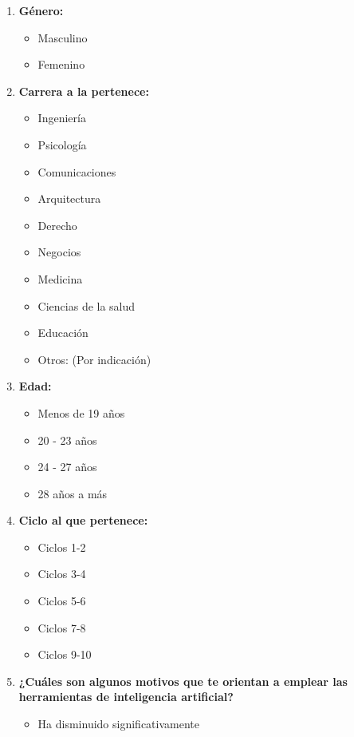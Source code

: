 \documentclass{article}
\newenvironment{recoleccionDeInformacion}{}{}
\begin{document}
\begin{recoleccionDeInformacion}
  \begin{multicols}{2}
    \begin{enumerate}
      \item \textbf{Género:}
      \begin{itemize}
        \item Masculino
        \item Femenino
      \end{itemize}
      \item \textbf{Carrera a la pertenece:}
      \begin{itemize}
        \item Ingeniería
        \item Psicología
        \item Comunicaciones
        \item Arquitectura
        \item Derecho
        \item Negocios
        \item Medicina
        \item Ciencias de la salud
        \item Educación
        \item Otros: (Por indicación)
      \end{itemize}
      \item \textbf{Edad:}
      \begin{itemize}
        \item Menos de 19 años
        \item 20 - 23 años
        \item 24 - 27 años
        \item 28 años a más
      \end{itemize}
      \item \textbf{Ciclo al que pertenece:}
      \begin{itemize}
        \item Ciclos 1-2
        \item Ciclos 3-4
        \item Ciclos 5-6
        \item Ciclos 7-8
        \item Ciclos 9-10
      \end{itemize}
      \item \textbf{¿Cuáles son algunos motivos que te orientan a emplear las herramientas de inteligencia artificial?}
      \begin{itemize}
          \item Ha disminuido significativamente

\end{itemize}
\end{enumerate}
\end{multicols}
\end{recoleccionDeInformacion}
\end{document}
